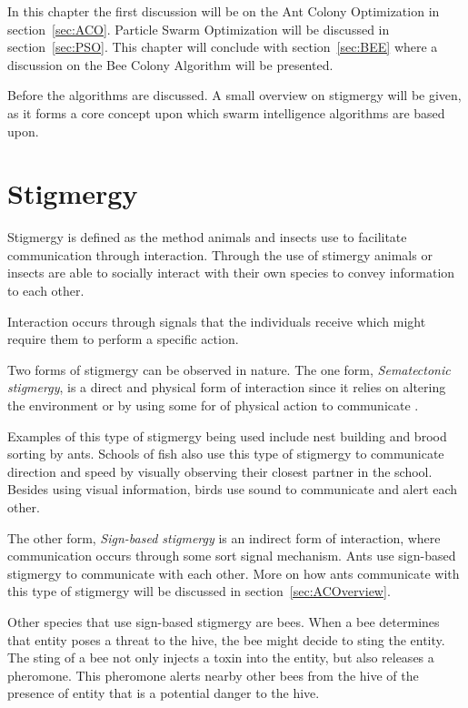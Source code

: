 In this chapter the first discussion will be on the Ant Colony Optimization in section~\ref{sec:ACO}. Particle Swarm Optimization will be discussed in section~\ref{sec:PSO}. This chapter will conclude with section~\ref{sec:BEE} where a discussion on the Bee Colony Algorithm will be presented. 

Before the algorithms are discussed. A small overview on stigmergy will be given, as it forms a core concept upon which swarm intelligence algorithms are based upon.
\section{Stigmergy}
\label{sec:stigmergy}
Stigmergy is defined as the method animals and insects use to facilitate communication through interaction\cite{AntsAndStigmergy,CompuIntelligenceIntro,AntIntroTrends,FundamentalSwarm}. Through the use of stimergy animals or insects are able to socially interact with their own species to convey information to each other\cite{AntsAndStigmergy,CompuIntelligenceIntro,AntIntroTrends,FundamentalSwarm}.

Interaction occurs through signals that the individuals receive which might require them to perform a specific action\cite{AntsAndStigmergy,CompuIntelligenceIntro,AntIntroTrends}.

Two forms of stigmergy can be observed in nature. The one form, \emph{Sematectonic stigmergy}\label{def:sematectonic}, is a direct and physical form of interaction since it relies on altering the environment or by using some for of physical action to communicate \cite{CompuIntelligenceIntro}. 

Examples of this type of stigmergy being used include nest building and brood sorting by ants\cite{CompuIntelligenceIntro}. Schools of fish also use this type of stigmergy to communicate direction and speed by visually observing their closest partner in the school. Besides using visual information, birds use sound to communicate and alert each other\cite{SwarmArt}.

The other form, \emph{Sign-based stigmergy} is an indirect form of interaction, where communication occurs through some sort signal mechanism\cite{CompuIntelligenceIntro}. Ants use sign-based stigmergy to communicate with each other. More on how ants communicate with this type of stigmergy will be discussed in section~\ref{sec:ACOverview}.

Other species that use sign-based stigmergy are bees\cite{stigmergicoptimization}. When a bee determines that entity poses a threat to the hive, the bee might decide to sting the entity. The sting of a bee not only injects a toxin into the entity, but also releases a pheromone\cite{stigmergicoptimization}. This pheromone alerts nearby other bees from the hive of the presence of entity that is a potential danger to the hive\cite{stigmergicoptimization}. 

